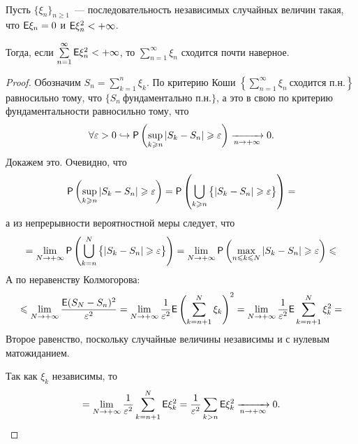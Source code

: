 \begin{theorem}~

	Пусть $\{\xi_n \}_{n \geqslant 1}$~--- последовательность независимых случайных величин такая, что $\E \xi_n = 0 $ и $\E \xi_n^2 < +\infty$. 
	
	Тогда, если $\sum\limits_{n = 1}^{\infty} \E \xi_n^2 < +\infty$, то $ \sum\limits_{n = 1}^{\infty} \xi_n$ сходится почти наверное.
	\begin{proof}
		Обозначим $S_n = \sum\limits_{k=1}^n \xi_k$. По критерию Коши $\left\{ \sum\limits_{n = 1}^{\infty}\xi_n~\text{сходится п.н.} \right\}$ равносильно тому, что $\{ S_n~\text{фундаментально п.н.}\}$, а это в свою по критерию фундаментальности равносильно тому, что 
		$$\forall \varepsilon > 0 \hookrightarrow \P \left( \sup\limits_{k \geqslant n} | S_k - S_n | \geqslant \varepsilon \right) \limn 0.$$ Докажем это.
		 Очевидно, что
		 $$\P \left( \sup\limits_{k \geqslant n} | S_k - S_n | \geqslant \varepsilon \right) = \P \left( \bigcup\limits_{k \geqslant n} \big\{| S_k - S_n | \geqslant \varepsilon \big\} \right) =$$
		 а из непрерывности вероятностной меры следует, что 
		 $$= \lim\limits_{N \rightarrow +\infty} \P \left( \bigcup\limits_{k = n}^{N} \big\{| S_k - S_n | \geqslant \varepsilon \big\} \right) = \lim\limits_{N \rightarrow +\infty} \P \left( \max\limits_{n \leqslant k \leqslant N} | S_k - S_n | \geqslant \varepsilon \right) \leqslant$$
		 А по неравенству Колмогорова:
		 $$\leqslant \lim\limits_{N \rightarrow + \infty} \dfrac{\E ( S_N - S_n)^2}{\varepsilon^2} = \lim\limits_{N \rightarrow + \infty} \dfrac{1}{\varepsilon^2} \E \left(\sum\limits_{k = n + 1}^N \xi_k\right)^2 = \lim\limits_{N \rightarrow + \infty} \dfrac{1}{\varepsilon^2} \E \sum\limits_{k = n + 1}^N \xi_k^2 = $$
		 Второе равенство, поскольку случайные величины независимы и с нулевым матожиданием.
		 
		 Так как $\xi_k$ независимы, то
		 $$= \lim\limits_{N \rightarrow + \infty} \dfrac{1}{\varepsilon^2} \sum\limits_{k = n + 1}^N \E \xi_k^2 = \dfrac{1}{\varepsilon^2} \sum\limits_{k > n} \E \xi_k^2 \limn 0.$$
	\end{proof}
\end{theorem}

